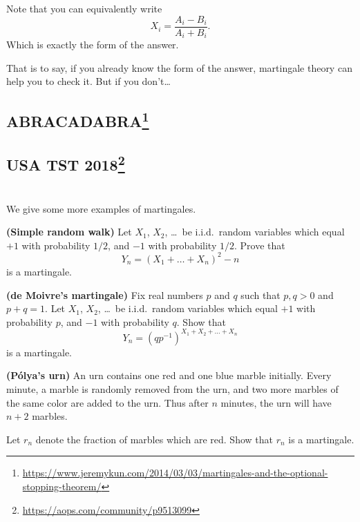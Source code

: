 \begin{remark}
	Note that you can equivalently write
	\[ X_i = \frac{A_i-B_i}{A_i+B_i}. \]
	Which is exactly the form of the answer.

	That is to say, if you already know the form of the answer, martingale theory can help you to
	check it. But if you don't\dots
\end{remark}

\subsection{ABRACADABRA\texorpdfstring{\protect\footnote{%
\url{https://www.jeremykun.com/2014/03/03/martingales-and-the-optional-stopping-theorem/}}}{}}


\subsection{USA TST 2018\texorpdfstring{\protect\footnote{%
\url{https://aops.com/community/p9513099}}}{}}

\section{\problemhead}

\begin{problem}
	\label{exer:martingale}
	We give some more examples of martingales.
	\begin{enumerate}[(a)]
		\ii \textbf{(Simple random walk)}
		Let $X_1$, $X_2$, \dots\ be i.i.d.\ random variables
		which equal $+1$ with probability $1/2$,
		and $-1$ with probability $1/2$.
		Prove that
		\[ Y_n = \left( X_1 + \dots + X_n \right)^2 - n \]
		is a martingale.

		\ii \textbf{(de Moivre's martingale)}
		Fix real numbers $p$ and $q$ such that $p,q > 0$ and $p+q=1$.
		Let $X_1$, $X_2$, \dots\ be i.i.d.\ random variables
		which equal $+1$ with probability $p$,
		and $-1$ with probability $q$.
		Show that
		\[ Y_n = \left(qp^{-1}\right)^{X_1 + X_2 + \dots + X_n} \]
		is a martingale.

		\ii \textbf{(P\'{o}lya's urn)}
		An urn contains one red and one blue marble initially.
		Every minute, a marble is randomly removed from the urn,
		and two more marbles of the same color are added to the urn.
		Thus after $n$ minutes, the urn will have $n+2$ marbles.

		Let $r_n$ denote the fraction of marbles which are red.
		Show that $r_n$ is a martingale.
	\end{enumerate}
\end{problem}

